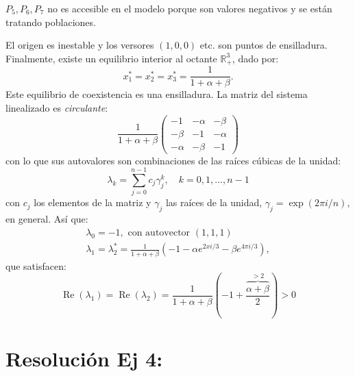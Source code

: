 \documentclass[twocolumn,aps,prl]{revtex4-1}
\begin{document}
$P_5, P_6, P_7$ no es accesible en el modelo porque son valores negativos y se están tratando poblaciones.

El origen es inestable y los versores $(1,0,0)$ etc. son puntos de ensilladura. 
Finalmente, existe un equilibrio interior al octante $\mathbb{R}_{+}^{3}$, dado por:
$$
x_{1}^{*}=x_{2}^{*}=x_{3}^{*}=\frac{1}{1+\alpha+\beta} .
$$
Este equilibrio de coexistencia es una ensilladura. La matriz del sistema linealizado es \textit{circulante}:
$$
\frac{1}{1+\alpha+\beta}\left(\begin{array}{ccc}
-1 & -\alpha & -\beta \\
-\beta & -1 & -\alpha \\
-\alpha & -\beta & -1
\end{array}\right)
$$
con lo que sus autovalores son combinaciones de las raíces cúbicas de la unidad:
$$
\lambda_{k}=\sum_{j=0}^{n-1} c_{j} \gamma_{j}^{k}, \quad k=0,1, \ldots, n-1
$$
con $c_{j}$ los elementos de la matriz y $\gamma_{j}$ las raíces de la unidad, $\gamma_{j}=\exp (2 \pi i / n)$, en general. Así que:
$$
\begin{array}{c}
\lambda_{0}=-1, \text { con autovector }(1,1,1) \\
\lambda_{1}=\lambda_{2}^{*}=\frac{1}{1+\alpha+\beta}\left(-1-\alpha e^{2 x i / 3}-\beta e^{4 \pi i / 3}\right),
\end{array}
$$
que satisfacen:
$$
\operatorname{Re}\left(\lambda_{1}\right)=\operatorname{Re}\left(\lambda_{2}\right)=\frac{1}{1+\alpha+\beta}\left(-1+\frac{\overbrace{\alpha+\beta}^{>2}}{2}\right)>0
$$

% 
%                             
% 

\section{Resolución Ej 4:}

\end{document}
